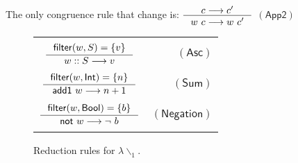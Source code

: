 \documentclass[preprint,authoryear,sort&compress,9pt,nocopyrightspace]{article}
\newcommand\rulename[1]{\mathsf{(#1)}}
\newcommand{\tto}{\longrightarrow}
\newcommand{\conf}[2][s]{(#2)[#1]}
\newcommand{\confextW}[1]{#1 [x \mapsto w \oplus s]}
\newcommand{\ascripS}[1]{#1::S}
\newcommand{\oletP}[3]{\mathsf{mlet} \ x = #2 \ \mathsf{in}  \ #3}
\newcommand{\absST}[2]{\lambda #1. \ #2}
\newcommand{\negacion}[1]{\mathsf{not} \ #1}
\newcommand{\suma}[1]{\mathsf{add1} \ #1}
\newcommand{\boolt}{\mathsf{Bool}}
\newcommand{\intt}{\mathsf{Int}}
\newcommand{\funt}{\mathsf{Fun}}
\newcommand{\filtrar}{\mathsf{filter}}
\newcommand{\buscar}{\mathsf{lookup}}
\newcommand{\semanticCc}{${\lambda}{\backslash}_1$}
\begin{document}
The only congruence rule that change is:
$ \inference {c \tto c'}{w \ c \tto w \ c'}$ $\rulename{App2}  $\\

\begin{figure}[]
\begin{small}
\begin{center}
\begin{tabular}{|c r|}
\hline
&\\
$ \inference {\filtrar(w, S) = \{v\}} {\ascripS{w} \tto v } $&$\rulename{Asc} $\\
&\\
$\inference {\filtrar(w, \intt)  = \{n\} }{\suma{w} \tto n + 1}$&$\rulename{Sum}$\\
&\\
$\inference {\filtrar(w, \boolt)  = \{b\} }{\negacion{w}\tto {\neg \ b}}$&$\rulename{Negation}$\\

&\\
\hline
\end{tabular}
\caption{Reduction rules for \semanticCc.}
\label{tabla:reductionRulesStrictMore}
\end{center}
\end{small}
\end{figure}
\end{document}
